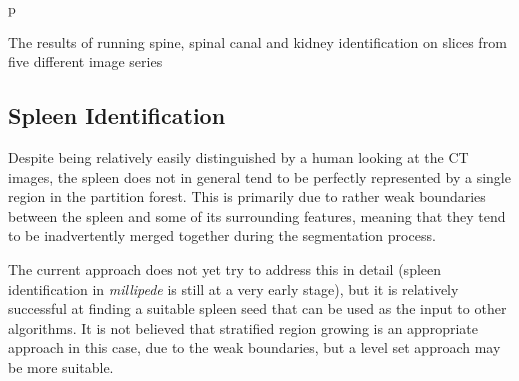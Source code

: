 \begin{stusubfig}{p}
	\\
\caption{The results of running spine, spinal canal and kidney identification on slices from five different image series}
\label{fig:featureid-3d-kidneysidentification-results}
\end{stusubfig}

\afterpage{\clearpage}
\newpage

\subsection{Spleen Identification}
\label{subsec:featureid-3d-spleen}


\noindent Despite being relatively easily distinguished by a human looking at the CT images, the spleen does not in general tend to be perfectly represented by a single region in the partition forest. This is primarily due to rather weak boundaries between the spleen and some of its surrounding features, meaning that they tend to be inadvertently merged together during the segmentation process.

The current approach does not yet try to address this in detail (spleen identification in \emph{millipede} is still at a very early stage), but it is relatively successful at finding a suitable spleen seed that can be used as the input to other algorithms. It is not believed that stratified region growing is an appropriate approach in this case, due to the weak boundaries, but a level set approach may be more suitable.

